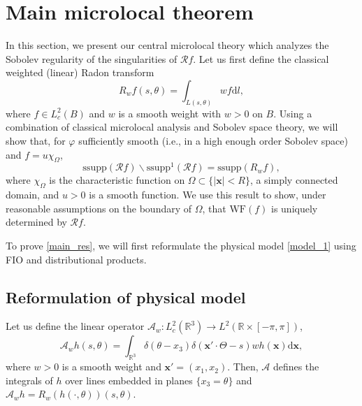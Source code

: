 \documentclass[a4paper,12pt]{amsart}
\numberwithin{equation}{section}
\theoremstyle{plain}
\numberwithin{theorem}{section}
\theoremstyle{definition}
\theoremstyle{remark}
\theoremstyle{remark}
\theoremstyle{remark}
\newcommand{\paren}[1]{\left(#1\right)}               %
\newcommand{\tred}[1]{{\color{red}#1}}
\newcommand{\WF}{\mathrm{WF}}                         %
\newcommand{\vx}{{\mathbf{x}}}
\newcommand{\jc}[1]{\begin{quotation}\textbf{James' comment:\
}{\textit{#1}}\end{quotation}}
\newcommand{\seanc}[1]{\begin{quotation}\textbf{Sean's comment:\
}{\textit{#1}}\end{quotation}}
\begin{document}
\section{Main microlocal theorem}
\label{main_thm_section}
In this section, we present our central microlocal theory which analyzes the Sobolev regularity of the singularities of $\mathcal{R}f$. Let us first define the classical weighted (linear) Radon transform
\begin{equation}
R_wf(s,\theta) = \int_{L(s,\theta)} wf \mathrm{d}l,
\end{equation}
where $f\in L^2_c(B)$ and $w$ is a smooth weight with $w > 0$ on $B$. Using a combination of classical microlocal analysis and Sobolev space theory, we will show that, for $\varphi$ sufficiently smooth (i.e., in a high enough order Sobolev space) and $f = u\chi_\Omega$,
\begin{equation}
\label{main_res}
\text{ssupp}\paren{\mathcal{R}f} \backslash \text{ssupp}^{1}\paren{\mathcal{R}f} = \text{ssupp}\paren{R_wf},
\end{equation}
where $\chi_\Omega$ is the characteristic function on $\Omega \subset \{|\vx| <R\}$, a simply connected domain, and $u>0$ is a smooth function. We use this result to show, under reasonable assumptions on the boundary of $\Omega$, that $\WF(f)$ is uniquely determined by $\mathcal{R}f$.

To prove \eqref{main_res}, we will first reformulate the physical model \eqref{model_1} using FIO and distributional products.

\subsection{Reformulation of physical model}
Let us define the linear operator $\mathcal{A}_w : L^2_c(\mathbb{R}^3) \to L^2(\mathbb{R} \times [-\pi,\pi])$,
\begin{equation}
\mathcal{A}_wh(s,\theta) = \int_{\mathbb{R}^3}\delta( \theta - x_3)\delta(\vx'\cdot \Theta - s) w h(\vx) \mathrm{d}\vx,
\end{equation}
where $w>0$ is a smooth weight and $\vx' = (x_1,x_2)$. Then, $\mathcal{A}$ defines the integrals of $h$ over lines embedded in planes $\{x_3 = \theta\}$ and $\mathcal{A}_wh = R_w(h(\cdot,\theta))(s,\theta)$.
\end{document}
